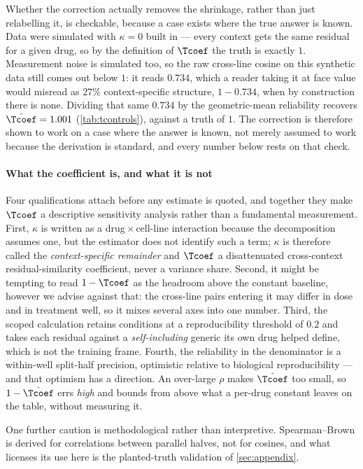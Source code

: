 Whether the correction actually removes the shrinkage, rather than just
relabelling it, is checkable, because a case exists where the true answer is
known. Data were simulated with $\kappa = 0$ built in --- every context gets the
same residual for a given drug, so by the definition of $\Tcoef$ the truth is
exactly $1$. Measurement noise is simulated too, so the raw cross-line cosine on
this synthetic data still comes out below $1$: it reads $0.734$, which a reader
taking it at face value would misread as $27\%$ context-specific structure,
$1 - 0.734$, when by construction there is none. Dividing that same $0.734$ by
the geometric-mean reliability recovers $\hat{\Tcoef} = 1.001$
(\cref{tab:tcontrols}), against a truth of $1$. The correction is therefore shown
to work on a case where the answer is known, not merely assumed to work because
the derivation is standard, and every number below rests on that check.

\paragraph{What the coefficient is, and what it is not} Four qualifications attach
before any estimate is quoted, and together they make $\Tcoef$ a descriptive
sensitivity analysis rather than a fundamental measurement. First, $\kappa$ is
written as a drug\,$\times$\,cell-line interaction because the decomposition
assumes one, but the estimator does not identify such a term; $\kappa$ is therefore
called the \emph{context-specific remainder} and $\Tcoef$ a disattenuated
cross-context residual-similarity coefficient, never a variance share. Second, it might be tempting to read $1 - \Tcoef$ as the headroom above the constant baseline, however we advise against that: the cross-line pairs
entering it may differ in dose and in treatment well, so it mixes several
axes into one number. Third, the scoped calculation retains conditions at a
reproducibility threshold of $0.2$ and takes each residual against a
\emph{self-including} generic its own drug helped define, which is not the training
frame. Fourth, the reliability in the denominator is a within-well split-half
precision, optimistic relative to biological reproducibility --- and that optimism
has a direction. An over-large $\rho$ makes $\hat{\Tcoef}$ too small, so
$1 - \hat{\Tcoef}$ errs \emph{high} and bounds from above what a per-drug constant
leaves on the table, without measuring it.

One further caution is methodological rather than interpretive. Spearman--Brown is
derived for correlations between parallel halves, not for cosines, and what
licenses its use here is the planted-truth validation of \cref{sec:appendix}.


